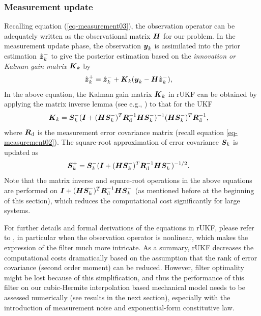 \subsubsection*{Measurement update}
Recalling equation (\ref{eq-measurement03}), the observation operator can be adequately written as the observational matrix $\matr{H}$ for our problem. In the measurement update phase, the observation $\vect{y}_k$ is assimilated into the prior estimation $\hat{\vect{z}}_k^-$ to give the posterior estimation based on the \emph{innovation or Kalman gain matrix} $\matr{K}_k$ by
\begin{align}
\hat{\vect{z}}_k^+ &= \hat{\vect{z}}_k^- + \matr{K}_k(\vect{y}_k - \matr{H} \hat{\vect{z}}_k^{-}),
\end{align}
In the above equation, the Kalman gain matrix $\matr{K}_k$ in rUKF can be obtained by applying the matrix inverse lemma (see e.g., \citealt{Simon2006Optimal}) to that for the UKF
\begin{align}
\matr{K}_k &=  \matr{S}_{k}^- (\matr{I} + (\matr{H} \matr{S}_{k}^-)^T \matr{R}_\textnormal{d}^{-1} \matr{H} \matr{S}_{k}^-)^{-1} (\matr{H} \matr{S}_{k}^-)^T \matr{R}_\textnormal{d}^{-1},
\end{align}
where $\matr{R}_\textnormal{d}$ is the measurement error covariance matrix (recall equation \ref{eq-measurement02}). The square-root approximation of error covariance $\matr{S}_{k}$ is updated as
\begin{align}
\matr{S}_{k}^+ &= \matr{S}_{k}^- (\matr{I} + (\matr{H} \matr{S}_{k}^-)^T \matr{R}_\textnormal{d}^{-1} \matr{H} \matr{S}_{k}^-)^{-1/2}.
\end{align}
Note that the matrix inverse and square-root operations in the above equations are performed on $\matr{I} + (\matr{H} \matr{S}_{k}^-)^T \matr{R}_\textnormal{d}^{-1} \matr{H} \matr{S}_{k}^-$ (as mentioned before at the beginning of this section), which reduces the computational cost significantly for large systems.

For further details and formal derivations of the equations in rUKF, please refer to \citet{Moireau2010Reduced}, in particular when the observation operator is nonlinear, which makes the expression of the filter much more intricate. As a summary, rUKF decreases the computational costs dramatically based on the assumption that the rank of error covariance (second order moment) can be reduced. However, filter optimality might be lost because of this simplification, and thus the performance of this filter on our cubic-Hermite interpolation based mechanical model needs to be assessed numerically (see results in the next section), especially with the introduction of measurement noise and exponential-form constitutive law.
